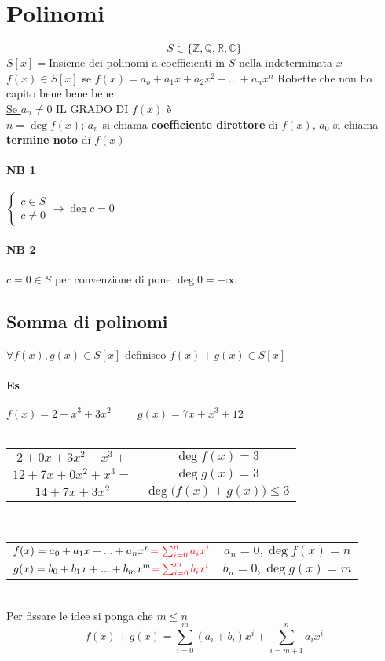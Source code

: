 \section{Polinomi}
$$S\in\{\mathbb{Z},\mathbb{Q},\mathbb{R},\mathbb{C}\}$$
$S[x] =$Insieme dei polinomi a coefficienti in $S$ nella indeterminata $x$\\
$f(x)\in S[x]$ se $f(x)=a_o+a_1x+a_2x^2+ ... +a_nx^n$
Robette che non ho capito bene bene bene\\
\underline{Se $a_n\neq 0$} IL GRADO DI $f(x)$ è \\
$n=\deg f(x)$; $a_n$ si chiama \textbf{coefficiente direttore} di $f(x)$,
$a_0$ si chiama \textbf{termine noto} di $f(x)$ 
\paragraph{NB 1}
$\begin{cases}
c\in S\\
c\neq 0
\end{cases} \longrightarrow \deg c=0$
\paragraph{NB 2} $c=0\in S$ \hspace{2cm}
per convenzione di pone $\deg 0=-\infty$
    \subsection{Somma di polinomi}
    $\forall f(x), g(x)\in S[x]$ definisco $f(x)+g(x)\in S[x]$
    \paragraph{Es} $f(x)= 2-x^3+3x^2\hspace{1cm}g(x)=7x+x^3+12$\\\\
    \begin{tabular}{c c}
        $2+0x+3x^2-x^3+$ & $\deg f(x)=3$\\
        $12+7x+0x^2+x^3=$ & $\deg g(x)=3$\\
        \hline
        $14+7x+3x^2$ & $\deg\big(f(x)+g(x) \big)\leq 3$
    \end{tabular}
    \\
    \begin{tabular}{c c}
        $f(x)=a_0+a_1x+...+a_nx^n{\color{red} =\sum_{i=0}^{n}a_ix^i}$ & 
        $a_n=0, \deg f(x)=n $\\
        $g(x)=b_0+b_1x+...+b_mx^m{\color{red} =\sum_{i=0}^{m}b_ix^i}$ & 
        $b_n=0, \deg g(x)=m $
    \end{tabular}\\
    {\color{blue} Per fissare le idee si ponga che $m\leq n$}
    $$f(x)+g(x)=\sum_{i=0}^{m}(a_i+b_i)x^i+\sum_{i=m+1}^{n}a_ix^i$$
